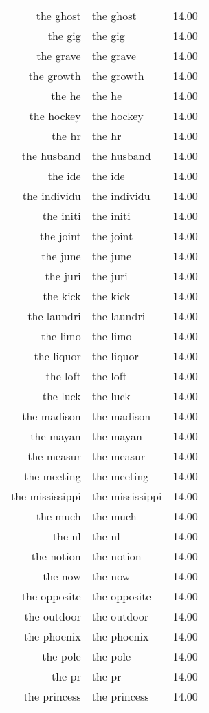 \begin{table}[ht]
\begin{tabular}{rlr}
  the ghost & the ghost & 14.00 \\ 
  the gig & the gig & 14.00 \\ 
  the grave & the grave & 14.00 \\ 
  the growth & the growth & 14.00 \\ 
  the he & the he & 14.00 \\ 
  the hockey & the hockey & 14.00 \\ 
  the hr & the hr & 14.00 \\ 
  the husband & the husband & 14.00 \\ 
  the ide & the ide & 14.00 \\ 
  the individu & the individu & 14.00 \\ 
  the initi & the initi & 14.00 \\ 
  the joint & the joint & 14.00 \\ 
  the june & the june & 14.00 \\ 
  the juri & the juri & 14.00 \\ 
  the kick & the kick & 14.00 \\ 
  the laundri & the laundri & 14.00 \\ 
  the limo & the limo & 14.00 \\ 
  the liquor & the liquor & 14.00 \\ 
  the loft & the loft & 14.00 \\ 
  the luck & the luck & 14.00 \\ 
  the madison & the madison & 14.00 \\ 
  the mayan & the mayan & 14.00 \\ 
  the measur & the measur & 14.00 \\ 
  the meeting & the meeting & 14.00 \\ 
  the mississippi & the mississippi & 14.00 \\ 
  the much & the much & 14.00 \\ 
  the nl & the nl & 14.00 \\ 
  the notion & the notion & 14.00 \\ 
  the now & the now & 14.00 \\ 
  the opposite & the opposite & 14.00 \\ 
  the outdoor & the outdoor & 14.00 \\ 
  the phoenix & the phoenix & 14.00 \\ 
  the pole & the pole & 14.00 \\ 
  the pr & the pr & 14.00 \\ 
  the princess & the princess & 14.00 \\ 

\end{tabular}
\end{table}
